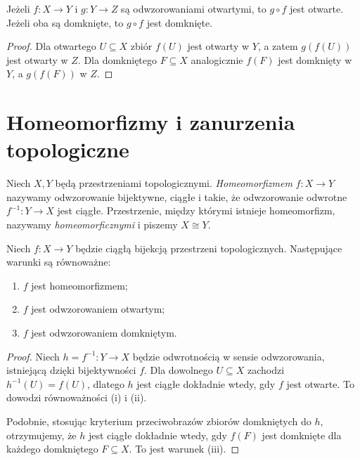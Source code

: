 \begin{stwierdzenie}
\label{prop:topog-skladanie-otwartych-domknietych}
Jeżeli $f\colon X\to Y$ i $g\colon Y\to Z$ są
odwzorowaniami otwartymi, to $g\circ f$ jest otwarte.
Jeżeli oba są domknięte, to $g\circ f$ jest domknięte.
\end{stwierdzenie}
\begin{proof}
Dla otwartego $U\subseteq X$ zbiór $f(U)$ jest otwarty
w $Y$, a zatem $g(f(U))$ jest otwarty w $Z$.
Dla domkniętego $F\subseteq X$ analogicznie
$f(F)$ jest domknięty w $Y$, a $g(f(F))$ w $Z$.
\end{proof}

\section{Homeomorfizmy i zanurzenia topologiczne}
\label{sec:topog-homeomorfizmy}

\begin{definicja}[Homeomorfizm]
\label{def:topog-homeomorfizm}
Niech $X,Y$ będą przestrzeniami topologicznymi.
\emph{Homeomorfizmem} $f\colon X\to Y$ nazywamy
odwzorowanie bijektywne, ciągłe i takie, że
odwzorowanie odwrotne $f^{-1}\colon Y\to X$ jest ciągłe.
Przestrzenie, między którymi istnieje homeomorfizm,
nazywamy \emph{homeomorficznymi} i piszemy $X\cong Y$.
\end{definicja}

\begin{twierdzenie}
\label{thm:topog-homeomorfizm-kryteria}
Niech $f\colon X\to Y$ będzie ciągłą bijekcją
przestrzeni topologicznych. Następujące warunki są
równoważne:
\begin{enumerate}[label=(\roman*)]
\item $f$ jest homeomorfizmem;
\item $f$ jest odwzorowaniem otwartym;
\item $f$ jest odwzorowaniem domkniętym.
\end{enumerate}
\end{twierdzenie}
\begin{proof}
Niech $h=f^{-1}\colon Y\to X$ będzie odwrotnością
w sensie odwzorowania, istniejącą dzięki bijektywności $f$.
Dla dowolnego $U\subseteq X$ zachodzi
$h^{-1}(U)=f(U)$, dlatego $h$ jest ciągłe
dokładnie wtedy, gdy $f$ jest otwarte. To dowodzi
równoważności (i) i (ii).

Podobnie, stosując kryterium przeciwobrazów zbiorów
domkniętych do $h$, otrzymujemy, że $h$ jest ciągłe
dokładnie wtedy, gdy $f(F)$ jest domknięte dla każdego
domkniętego $F\subseteq X$. To jest warunek (iii).
\end{proof}

